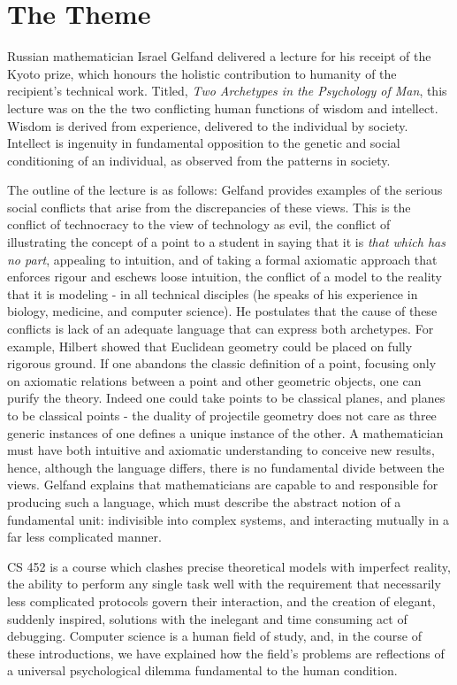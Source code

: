 \documentclass{amsart} \usepackage{amsmath} \usepackage{upgreek}
\begin{document}
\section*{The Theme}

Russian mathematician Israel Gelfand delivered a lecture for his receipt of the Kyoto prize, which honours the holistic contribution to humanity of the recipient's technical work. Titled, \textit{Two Archetypes in the Psychology of Man}, this lecture was on the the two conflicting human functions of wisdom and intellect. Wisdom is derived from experience, delivered to the individual by society. Intellect is ingenuity in fundamental opposition to the genetic and social conditioning of an individual, as observed from the patterns in society.

The outline of the lecture is as follows: Gelfand provides examples of the serious social conflicts that arise from the discrepancies of these views. This is the conflict of technocracy to the view of technology as evil, the conflict of illustrating the concept of a point to a student in saying that it is \textit{that which has no part}, appealing to intuition, and of taking a formal axiomatic approach that enforces rigour and eschews loose intuition, the conflict of a model to the reality that it is modeling - in all technical disciples (he speaks of his experience in biology, medicine, and computer science). He postulates that the cause of these conflicts is lack of an adequate language that can express both archetypes. For example, Hilbert showed that Euclidean geometry could be placed on fully rigorous ground. If one abandons the classic definition of a point, focusing only on axiomatic relations between a point and other geometric objects, one can purify the theory. Indeed one could take points to be classical planes, and planes to be classical points - the duality of projectile geometry does not care as three generic instances of one defines a unique instance of the other. A mathematician must have both intuitive and axiomatic understanding to conceive new results, hence, although the language differs, there is no fundamental divide between the views. Gelfand explains that mathematicians are capable to and responsible for producing such a language, which must describe the abstract notion of a fundamental unit: indivisible into complex systems, and interacting mutually in a far less complicated manner.

CS 452 is a course which clashes precise theoretical models with imperfect reality, the ability to perform any single task well with the requirement that necessarily less complicated protocols govern their interaction, and the creation of elegant, suddenly inspired, solutions with the inelegant and time consuming act of debugging. Computer science is a human field of study, and, in the course of these introductions, we have explained how the field's problems are reflections of a universal psychological dilemma fundamental to the human condition.
\end{document}
